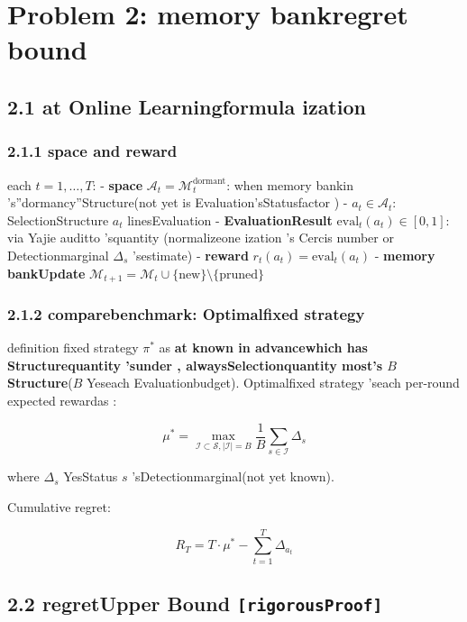 \documentclass[
  12pt,
]{article}
\begin{document}
\section{Problem
2: memory bankregret bound}\label{ux95eeux9898-2ux8bb0ux5fc6ux5e93ux9057ux61beux754c}

\subsection{2.1
at Online Learningformula ization }\label{ux5728ux7ebfux5b66ux4e60ux5f62ux5f0fux5316}

\subsubsection{2.1.1
space and reward}\label{ux52a8ux4f5cux7a7aux95f4ux4e0eux5956ux52b1}

each  \(t = 1, \ldots, T\):  - \textbf{space }
\(\mathcal{A}_t = \mathcal{M}_t^{\text{dormant}}\): when memory bankin 's''dormancy''Structure(not yet is Evaluation'sStatusfactor )
- \textbf{} \(a_t \in \mathcal{A}_t\): SelectionStructure \(a_t\) linesEvaluation -
\textbf{EvaluationResult}
\(\text{eval}_t(a_t) \in [0, 1]\): via Yajie auditto 'squantity (normalizeone ization 's
Cercis number or Detectionmarginal \(\Delta_s\) 'sestimate) - \textbf{reward}
\(r_t(a_t) = \text{eval}_t(a_t)\) - \textbf{memory bankUpdate}
\(\mathcal{M}_{t+1} = \mathcal{M}_t \cup \{\text{new}\} \setminus \{\text{pruned}\}\)

\subsubsection{2.1.2
comparebenchmark: Optimalfixed strategy }\label{ux6bd4ux8f83ux57faux51c6ux6700ux4f18ux56faux5b9aux7b56ux7565}

definition fixed strategy  \(\pi^*\)
as \textbf{at known in advancewhich has Structurequantity 'sunder , alwaysSelectionquantity most's \(B\)
Structure}(\(B\) Yeseach Evaluationbudget). Optimalfixed strategy 'seach per-round expected rewardas : 

\[\mu^* = \max_{\mathcal{I} \subset \mathcal{S}, |\mathcal{I}| = B} \frac{1}{B} \sum_{s \in \mathcal{I}} \Delta_s\]

where \(\Delta_s\) YesStatus \(s\) 'sDetectionmarginal(not yet known). 

Cumulative regret: 

\[\boxed{R_T = T \cdot \mu^* - \sum_{t=1}^{T} \Delta_{a_t}}\]

\subsection{\texorpdfstring{2.2 regretUpper Bound
\texttt{{[}rigorousProof{]}}}{2.2 regretUpper Bound {[}rigorousProof{]}}}\label{ux9057ux61beux4e0aux754c-ux4e25ux683cux8bc1ux660e}
\end{document}
